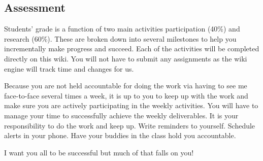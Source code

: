 \documentclass{article}
\begin{document}
\subsection*{Assessment}

Students' grade is a function of two main activities participation (40\%) and research (60\%). These are broken down into several milestones to help you incrementally make progress and succeed. Each of the activities will be completed directly on this wiki. You will not have to submit any assignments as the wiki engine will track time and changes for us.

Because you are not held accountable for doing the work via having to see me face-to-face several times a week, it is up to you to keep up with the work and make sure you are actively participating in the weekly activities. You will have to manage your time to successfully achieve the weekly deliverables. It is your responsibility to do the work and keep up. Write reminders to yourself. Schedule alerts in your phone. Have your buddies in the class hold you accountable.

I want you all to be successful but much of that falls on you!



\nocite{brady2019challenge, burrell2020society, caren2020contemporary, jerit2020political, zhuravskaya2020political}
\end{document}
